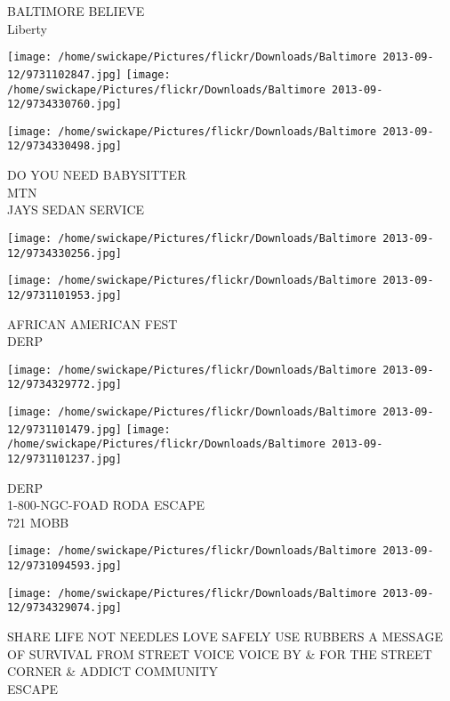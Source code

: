 \documentclass[10pt,letterpaper]{article}
\begin{document}
BALTIMORE BELIEVE\\
Liberty\\
\pagebreak

\texttt{[image: /home/swickape/Pictures/flickr/Downloads/Baltimore 2013-09-12/9731102847.jpg]}
\texttt{[image: /home/swickape/Pictures/flickr/Downloads/Baltimore 2013-09-12/9734330760.jpg]}

\vspace{0.25in}
\texttt{[image: /home/swickape/Pictures/flickr/Downloads/Baltimore 2013-09-12/9734330498.jpg]}

DO YOU NEED BABYSITTER\\
MTN\\
JAYS SEDAN SERVICE\\
\pagebreak

\texttt{[image: /home/swickape/Pictures/flickr/Downloads/Baltimore 2013-09-12/9734330256.jpg]}

\vspace{0.25in}
\texttt{[image: /home/swickape/Pictures/flickr/Downloads/Baltimore 2013-09-12/9731101953.jpg]}

AFRICAN AMERICAN FEST\\
DERP\\
\pagebreak

\texttt{[image: /home/swickape/Pictures/flickr/Downloads/Baltimore 2013-09-12/9734329772.jpg]}

\vspace{0.25in}
\texttt{[image: /home/swickape/Pictures/flickr/Downloads/Baltimore 2013-09-12/9731101479.jpg]}
\texttt{[image: /home/swickape/Pictures/flickr/Downloads/Baltimore 2013-09-12/9731101237.jpg]}

DERP\\
1{-}800{-}NGC{-}FOAD RODA ESCAPE\\
721 MOBB\\
\pagebreak

\texttt{[image: /home/swickape/Pictures/flickr/Downloads/Baltimore 2013-09-12/9731094593.jpg]}

\vspace{0.25in}
\texttt{[image: /home/swickape/Pictures/flickr/Downloads/Baltimore 2013-09-12/9734329074.jpg]}

SHARE LIFE NOT NEEDLES LOVE SAFELY USE RUBBERS A MESSAGE OF SURVIVAL FROM STREET VOICE VOICE BY \& FOR THE STREET CORNER \& ADDICT COMMUNITY\\
ESCAPE\\
\pagebreak
\end{document}
